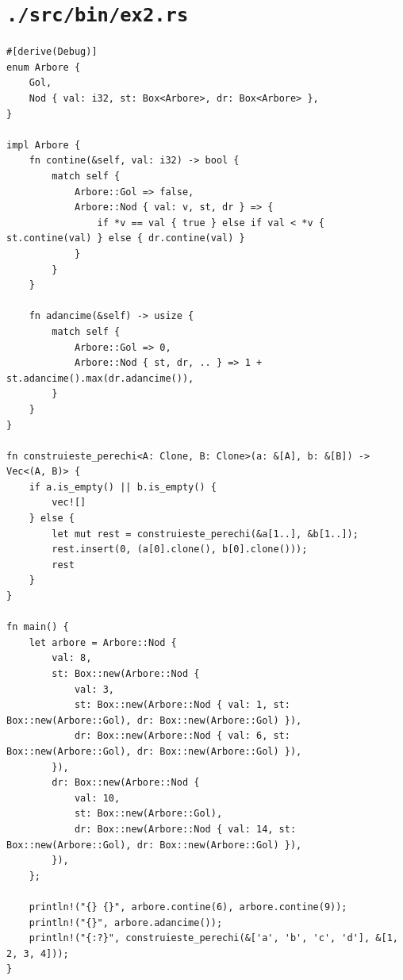 \documentclass[11pt]{article}
\begin{document}
\section{\texttt{./src/bin/ex2.rs}}
\label{sec:org321f9fe}
\begin{verbatim}
#[derive(Debug)]
enum Arbore {
    Gol,
    Nod { val: i32, st: Box<Arbore>, dr: Box<Arbore> },
}

impl Arbore {
    fn contine(&self, val: i32) -> bool {
        match self {
            Arbore::Gol => false,
            Arbore::Nod { val: v, st, dr } => {
                if *v == val { true } else if val < *v { st.contine(val) } else { dr.contine(val) }
            }
        }
    }

    fn adancime(&self) -> usize {
        match self {
            Arbore::Gol => 0,
            Arbore::Nod { st, dr, .. } => 1 + st.adancime().max(dr.adancime()),
        }
    }
}

fn construieste_perechi<A: Clone, B: Clone>(a: &[A], b: &[B]) -> Vec<(A, B)> {
    if a.is_empty() || b.is_empty() {
        vec![]
    } else {
        let mut rest = construieste_perechi(&a[1..], &b[1..]);
        rest.insert(0, (a[0].clone(), b[0].clone()));
        rest
    }
}

fn main() {
    let arbore = Arbore::Nod {
        val: 8,
        st: Box::new(Arbore::Nod {
            val: 3,
            st: Box::new(Arbore::Nod { val: 1, st: Box::new(Arbore::Gol), dr: Box::new(Arbore::Gol) }),
            dr: Box::new(Arbore::Nod { val: 6, st: Box::new(Arbore::Gol), dr: Box::new(Arbore::Gol) }),
        }),
        dr: Box::new(Arbore::Nod {
            val: 10,
            st: Box::new(Arbore::Gol),
            dr: Box::new(Arbore::Nod { val: 14, st: Box::new(Arbore::Gol), dr: Box::new(Arbore::Gol) }),
        }),
    };

    println!("{} {}", arbore.contine(6), arbore.contine(9));
    println!("{}", arbore.adancime());
    println!("{:?}", construieste_perechi(&['a', 'b', 'c', 'd'], &[1, 2, 3, 4]));
}
\end{verbatim}
\end{document}
